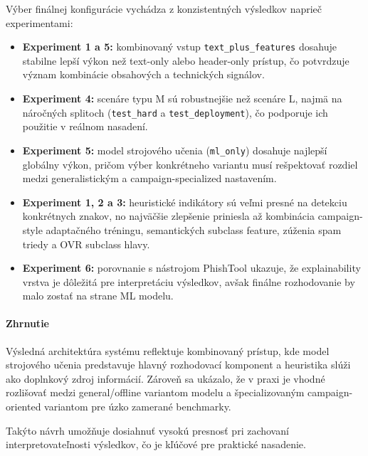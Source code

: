 \documentclass[conference]{IEEEtran}
\begin{document}
Výber finálnej konfigurácie vychádza z konzistentných výsledkov naprieč experimentami:

\begin{itemize}
    \item \textbf{Experiment 1 a 5:}
    kombinovaný vstup \texttt{text\_plus\_features} dosahuje stabilne lepší výkon
    než text-only alebo header-only prístup, čo potvrdzuje význam kombinácie
    obsahových a technických signálov.
    
    \item \textbf{Experiment 4:}
    scenáre typu M sú robustnejšie než scenáre L,
    najmä na náročných splitoch (\texttt{test\_hard} a \texttt{test\_deployment}),
    čo podporuje ich použitie v reálnom nasadení.
    
    \item \textbf{Experiment 5:}
    model strojového učenia (\texttt{ml\_only}) dosahuje najlepší globálny výkon,
    pričom výber konkrétneho variantu musí rešpektovať rozdiel medzi generalistickým
    a campaign-specialized nastavením.
    
    \item \textbf{Experiment 1, 2 a 3:}
    heuristické indikátory sú veľmi presné na detekciu konkrétnych znakov,
    no najväčšie zlepšenie priniesla až kombinácia campaign-style adaptačného tréningu,
    semantických subclass feature, zúženia spam triedy a OVR subclass hlavy.
    
    \item \textbf{Experiment 6:}
    porovnanie s nástrojom PhishTool ukazuje,
    že explainability vrstva je dôležitá pre interpretáciu výsledkov,
    avšak finálne rozhodovanie by malo zostať na strane ML modelu.
\end{itemize}

\paragraph{Zhrnutie}

Výsledná architektúra systému reflektuje kombinovaný prístup,
kde model strojového učenia predstavuje hlavný rozhodovací komponent
a heuristika slúži ako doplnkový zdroj informácií. Zároveň sa ukázalo,
že v praxi je vhodné rozlišovať medzi general/offline variantom modelu
a špecializovaným campaign-oriented variantom pre úzko zamerané benchmarky.

Takýto návrh umožňuje dosiahnuť vysokú presnosť pri zachovaní
interpretovateľnosti výsledkov, čo je kľúčové pre praktické nasadenie.
\end{document}
